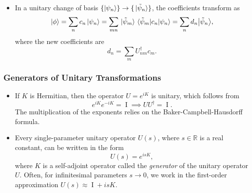 \documentclass[11pt, a4paper]{article}
\newcommand{\Herm}{Hermitian\xspace}
\renewcommand{\t}[1]{\tilde{#1}}
\newcommand{\II}{\operatorname{I}}  %
\newcommand{\p}{\psi}  %
\newcommand{\bket}[1]{\big | {#1} \big \rangle }
\begin{document}
\begin{itemize}
	\item In a unitary change of basis $ \{\ket{\p_{n}}\} \to \{\ket*{\t{\p}_{n}}\} $, the coefficients transform as
	\begin{equation*}
		\ket{\phi} = \sum_{n}c_{n}\ket{\p_{n}} = \sum_{mn}\ket*{\t{\p}_{m}}\mel*{\t{\p}_{m}}{c_{n}}{\p_{n}} = \sum_{n}d_{n}\bket{\tilde{\p}_{n}},
	\end{equation*}
	where the new coefficients are
	\begin{equation*}
		d_{n} = \sum_{m}U_{nm}^{\dagger}c_{m}.
	\end{equation*}
	
\end{itemize}

\subsubsection{Generators of Unitary Transformations}
\begin{itemize}

	\item If $ K $ is \Herm, then the operator $ U = e^{iK} $ is unitary, which follows from
    \begin{equation*}
        e^{iK}e^{-iK} = \II \implies U U^{\dagger} = \II.
    \end{equation*}
    The multiplication of the exponents relies on the Baker-Campbell-Hausdorff formula.

	\item Every single-parameter unitary operator $ U(s) $, where $ s \in \mathbb{R} $ is a real constant, can be written in the form 
	\begin{equation*}
		U(s) = e^{isK},
	\end{equation*}
    where $ K $ is a self-adjoint operator called the \textit{generator} of the unitary operator $ U $. Often, for infinitesimal parameters $ s \to 0 $, we work in the first-order approximation $ U(s) \approx \II + isK $.
	
\end{itemize}
\end{document}
